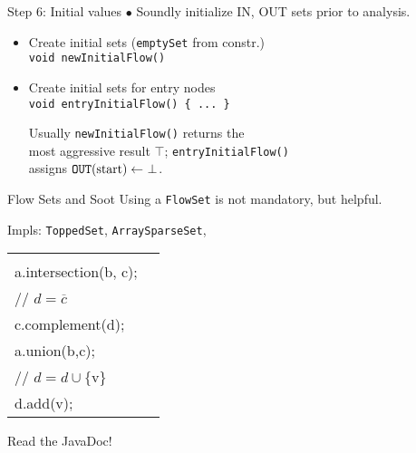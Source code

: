 \begin{slide}{Step 6: Initial values}
\vspace*{-0.1in}
$\bullet$ Soundly initialize IN, OUT sets prior to analysis.

\begin{itemize}

\item Create initial sets ({\tt emptySet} from constr.)\\
{\tt void newInitialFlow()}\\

\item Create initial sets for entry nodes\\
{\tt void entryInitialFlow() \{ ... \} }

\vspace*{0.09in}

Usually {\tt newInitialFlow()} returns the \\ \quad most aggressive result
$\top$; {\tt entryInitialFlow()} \\ \quad assigns
 $\mbox{\tt OUT}(\mbox{start}) 
\gets\ \perp$.
\end{itemize}
\end{slide}

\begin{slide}{Flow Sets and Soot}
\vspace*{-0.1in}
Using a {\tt FlowSet} is not mandatory, but helpful.

\quad

Impls: {\tt ToppedSet}, {\tt ArraySparseSet}, \\
\qquad {}

\quad

\begin{tabular}{ll}
\begin{minipage}{0.5\textwidth}
{\small \tt 
// $c = a \cap b$ \\
a.intersection(b, c); \\

// $d = \overline{c}$\\
c.complement(d);
}
\end{minipage} &
\begin{minipage}{0.3\textwidth}
{\small \tt
// $c = a \cup b$ \\
a.union(b,c);\\

// $d = d \cup \{ \mbox{v} \}$\\
d.add(v);
}
\end{minipage}

\end{tabular}

\quad

\begin{center}
Read the JavaDoc!
\end{center}
\end{slide}

